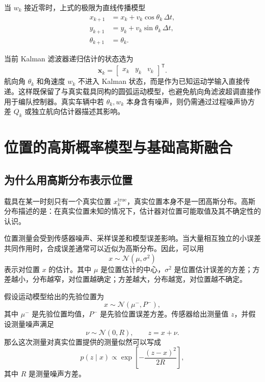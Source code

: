 \documentclass[UTF8,a4paper,11pt]{ctexart}
\newcommand{\prior}{^{-}}
\newcommand{\transpose}{^{\mathsf T}}
\begin{document}
当 $w_k$ 接近零时，上式的极限为直线传播模型
\begin{align}
x_{k+1}&=x_k+v_k\cos\theta_k\,\Delta t,\\
y_{k+1}&=y_k+v_k\sin\theta_k\,\Delta t,\\
\theta_{k+1}&=\theta_k.
\end{align}

当前 Kalman 滤波器递归估计的状态选为
\begin{equation}
\bm x_k=
\begin{bmatrix}
x_k&y_k&v_k
\end{bmatrix}\transpose.
\end{equation}
航向角 $\theta_k$ 和角速度 $w_k$ 不进入 Kalman 状态，而是作为已知运动学输入直接传递。这样既保留了与真实载具同构的圆弧运动模型，也避免航向角滤波超调直接作用于编队控制器。真实车辆中若 $\theta_k,w_k$ 本身含有噪声，则仍需通过过程噪声协方差 $Q_k$ 或独立航向估计器描述其影响。

\section{位置的高斯概率模型与基础高斯融合}

\subsection{为什么用高斯分布表示位置}

载具在某一时刻只有一个真实位置 $x_k^{\mathrm{true}}$，真实位置本身不是一团高斯分布。高斯分布描述的是：在真实位置未知的情况下，估计器对位置可能取值及其不确定性的认识。

位置测量会受到传感器噪声、采样误差和模型误差影响。当大量相互独立的小误差共同作用时，合成误差通常可以近似为高斯分布。因此，可以用
\begin{equation}
x\sim\mathcal N(\mu,\sigma^2)
\end{equation}
表示对位置 $x$ 的估计。其中 $\mu$ 是位置估计的中心，$\sigma^2$ 是位置估计误差的方差；方差越小，分布越窄，对位置越确定；方差越大，分布越宽，对位置越不确定。

假设运动模型给出的先验位置为
\begin{equation}
x\sim\mathcal N(\mu\prior,P\prior),
\end{equation}
其中 $\mu\prior$ 是先验位置均值，$P\prior$ 是先验位置误差方差。传感器给出测量值 $z$，并假设测量噪声满足
\begin{equation}
\nu\sim\mathcal N(0,R),
\qquad
z=x+\nu.
\end{equation}
那么这次测量对真实位置提供的测量似然可以写成
\begin{equation}
p(z\mid x)
\propto
\exp\!\left[-\frac{(z-x)^2}{2R}\right],
\end{equation}
其中 $R$ 是测量噪声方差。
\end{document}
